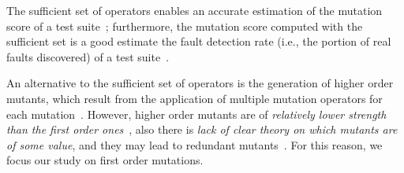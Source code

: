 The sufficient set of operators enables an accurate estimation of the mutation score of a test suite~\cite{siami2008sufficient}; furthermore, the mutation score computed with the sufficient set is a good estimate the fault detection rate (i.e., the portion of real faults discovered) of a test suite~\cite{andrews2005mutation}. 







An alternative to the sufficient set of operators is the generation of higher order mutants, which result from the application of multiple mutation operators for each mutation~\cite{jia2009higher,kintis2010evaluating,offutt1992investigations,papadakis2010empirical}. However, higher order mutants are of \emph{relatively lower strength than the first order ones}~\cite{papadakis2010mutation,papadakis2019mutation}, also there is \emph{lack of clear theory on which mutants are of some value}, and they may lead to redundant mutants~\cite{papadakis2019mutation}. For this reason, we focus our study on first order mutations.

%
%
%


%
%

